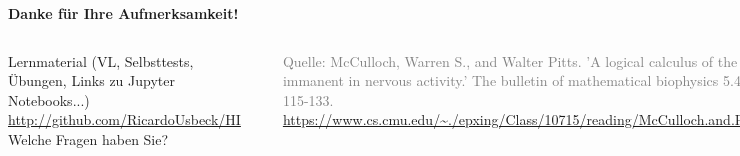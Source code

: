 \documentclass[aspectratio=169]{beamer}
\begin{document}
\begin{frame}{\textbf{Danke für Ihre Aufmerksamkeit!}}
    \begin{columns}
	 \begin{center}
        \small{\faGraduationCap \hspace{0.15em} {Lernmaterial (VL, Selbsttests, Übungen, Links zu Jupyter Notebooks...)\\\small{\faGithub \hspace{0.15em} {\href{https://github.com/RicardoUsbeck/HI}{http://github.com/RicardoUsbeck/HI}}}}} \\
        \smallskip
        \Huge {Welche Fragen haben Sie?} \\
        
    \end{center}
	\centering
	\includegraphics[width=0.7\linewidth]{mcculloch.png}\\
	
	\vspace{5mm}
	
	\tiny \textcolor{gray}{Quelle: McCulloch, Warren S., and Walter Pitts. 'A logical calculus of the ideas immanent in nervous activity.' The bulletin of mathematical biophysics 5.4 (1943): 115-133. \url{https://www.cs.cmu.edu/~./epxing/Class/10715/reading/McCulloch.and.Pitts.pdf}}

\end{columns}
\end{frame}
\end{document}
